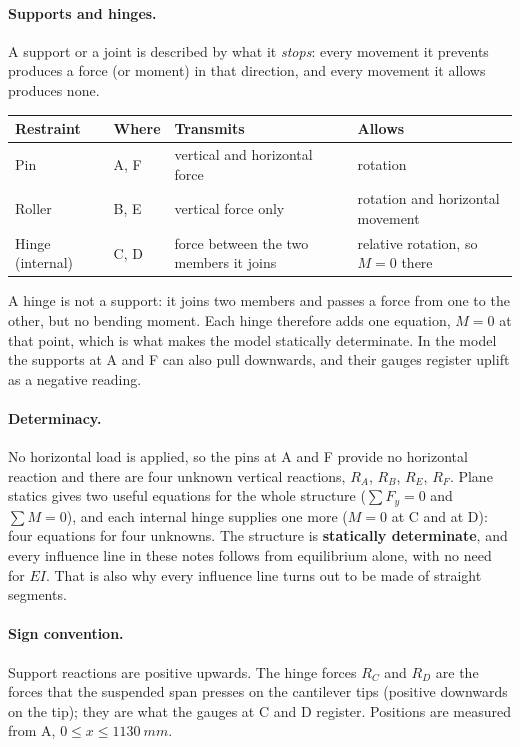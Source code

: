 \documentclass[11pt,a4paper]{article}
\begin{document}
\paragraph{Supports and hinges.} A support or a joint is described by what it \emph{stops}: every movement it prevents produces a force (or moment) in that direction, and every movement it allows produces none.

\begin{center}\small
\begin{tabular}{@{}llll@{}}\toprule
Restraint & Where & Transmits & Allows\\\midrule
Pin & A, F & vertical and horizontal force & rotation\\
Roller & B, E & vertical force only & rotation and horizontal movement\\
Hinge (internal) & C, D & force between the two members it joins & relative rotation, so $M = 0$ there\\\bottomrule
\end{tabular}
\end{center}
A hinge is not a support: it joins two members and passes a force from one to the other, but no bending moment. Each hinge therefore adds one equation, $M = 0$ at that point, which is what makes the model statically determinate. In the model the supports at A and F can also pull downwards, and their gauges register uplift as a negative reading.

\paragraph{Determinacy.} No horizontal load is applied, so the pins at A and F provide no horizontal reaction and there are four unknown vertical reactions, $R_A$, $R_B$, $R_E$, $R_F$. Plane statics gives two useful equations for the whole structure ($\sum F_y = 0$ and $\sum M = 0$), and each internal hinge supplies one more ($M = 0$ at C and at D): four equations for four unknowns. The structure is \textbf{statically determinate}, and every influence line in these notes follows from equilibrium alone, with no need for $EI$. That is also why every influence line turns out to be made of straight segments.

\paragraph{Sign convention.} Support reactions are positive upwards. The hinge forces $R_C$ and $R_D$ are the forces that the suspended span presses on the cantilever tips (positive downwards on the tip); they are what the gauges at C and D register. Positions are measured from A, $0 \le x \le \SI{1130}{mm}$.
\end{document}
